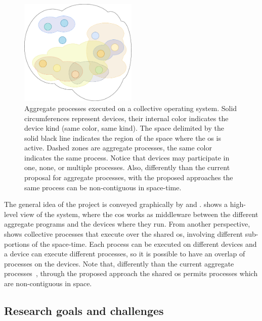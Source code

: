 \documentclass[12pt, a4paper]{article}
\begin{document}
\begin{figure}
    \centering
    \includegraphics[width=0.5\textwidth]{figures/processes}
    \caption{
        Aggregate processes executed on a collective operating system.
        Solid circumferences represent devices, their internal color indicates the device kind
        (same color, same kind).
        The space delimited by the solid black line indicates the region of the space where the
        \ac{os} is active.
        Dashed zones are aggregate processes,
        the same color indicates the same process.
        Notice that devices may participate in one, none, or multiple processes.
        Also, differently than the current proposal for aggregate processes,
        with the proposed approaches the same process can be non-contiguous in space-time.
    }\label{fig:processes}
\end{figure}

The general idea of the project is conveyed graphically by
 and .
%
 shows a high-level view of the system,
where the \ac{cos} works as middleware between the different aggregate programs and the devices where they run.
%
From another perspective,
 shows collective processes that execute over the shared \ac{os},
involving different sub-portions of the space-time.
%
Each process can be executed on different devices and a device can execute different processes,
so it is possible to have an overlap of processes on the devices.
%
Note that, differently than the current aggregate processes~\cite{EAAI2020-processes},
through the proposed approach
the shared \ac{os} permits processes which are non-contiguous in space.


\subsection{Research goals and challenges}
\label{subsec:research-goals-and-challenges}
\end{document}
